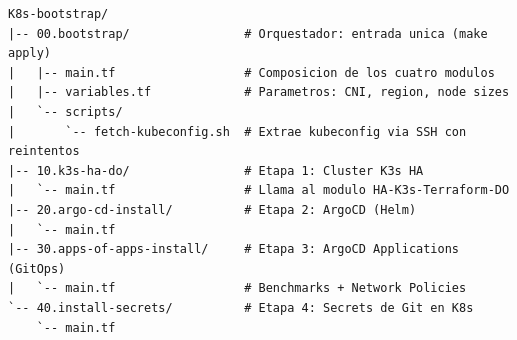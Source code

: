 \begin{verbatim}
K8s-bootstrap/
|-- 00.bootstrap/                # Orquestador: entrada unica (make apply)
|   |-- main.tf                  # Composicion de los cuatro modulos
|   |-- variables.tf             # Parametros: CNI, region, node sizes
|   `-- scripts/
|       `-- fetch-kubeconfig.sh  # Extrae kubeconfig via SSH con reintentos
|-- 10.k3s-ha-do/                # Etapa 1: Cluster K3s HA
|   `-- main.tf                  # Llama al modulo HA-K3s-Terraform-DO
|-- 20.argo-cd-install/          # Etapa 2: ArgoCD (Helm)
|   `-- main.tf
|-- 30.apps-of-apps-install/     # Etapa 3: ArgoCD Applications (GitOps)
|   `-- main.tf                  # Benchmarks + Network Policies
`-- 40.install-secrets/          # Etapa 4: Secrets de Git en K8s
    `-- main.tf
\end{verbatim}

